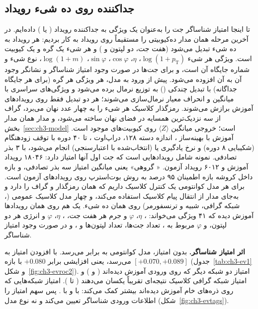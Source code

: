 \subsection{جداکننده روی ده شیء رویداد}
\label{sec:ch3-evqgnn}
تا اینجا امتیاز شناساگر جت را به‌عنوان یک ویژگی به جداکننده رویداد ( یا ) داده‌ایم. در آخرین مرحله همان مدار ده‌کیوبیتی را مستقیماً روی رویداد به کار بردیم: هر رویداد به ده شیء تبدیل می‌شود (هفت جت، دو لپتون و ) و هر شیء یک گره و یک کیوبیت است. ویژگی هر شیء $\log(1+p_\mathrm{T})$، $\eta$، $\cos\varphi$، $\sin\varphi$، $\log(1+m)$، نوع شیء و شماره جایگاه آن است، و برای جت‌ها در صورت وجود امتیاز شناساگر و نشانگر وجود آن به آن افزوده می‌شود. پیش از ورود به مدل، هر ویژگی هر گره (برای هر جایگاه جداگانه) با تبدیل چندکی () به توزیع نرمال برده می‌شود و ویژگی‌های سراسری با میانگین و انحراف معیار نرمال‌سازی می‌شوند؛ هر دو تبدیل فقط روی رویدادهای آموزش برازش می‌شوند. رمزگذار کلاسیک هر شیء را به چهار عدد نهان می‌برد، گراف از سه نزدیک‌ترین همسایه در فضای نهان ساخته می‌شود، و مدار همان مدار بخش~\ref{sec:ch3-model} است؛ خروجی میانگین $\langle Z\rangle$ روی کیوبیت‌های موجود است. آموزش با بهینه‌ساز ، اندازه دسته ۱۲۸، دراپ‌اوت ، تا ۴۰ دوره با توقف زودهنگام (شکیبایی ۸ دوره) و نرخ یادگیری  یا  (انتخاب‌شده با اعتبارسنجی) انجام می‌شود، با ۳ بذر تصادفی. نمونه شامل رویدادهایی است که جت اول آنها امتیاز دارد: ۱۸۰۴۶ رویداد آموزش و ۶۰۱۲ رویداد آزمون. « گروهی» یعنی  میانگین امتیاز سه بذر تصادفی، و بازه داخل کروشه بازه اطمینان ۹۵ درصد به روش بوت‌استرپ روی رویدادهای آزمون است. برای هر مدل کوانتومی یک کنترل کلاسیک داریم که همان رمزگذار و گراف را دارد و به‌جای مدار از انتقال پیام کلاسیک استفاده می‌کند، و چهار مدل کلاسیک عمومی (، شبکه گرافی، شبیه  و ترنسفورمر) روی همان ده شیء. یک  هم روی همان رویدادها آموزش دیده که ۴۱ ویژگی می‌خواند: \pt، $\eta$، $\varphi$ و جرم هر هفت جت، \pt، $\eta$، $\varphi$ و انرژی هر دو لپتون، \pt و $\varphi$ مربوط به ، تعداد جت‌ها، تعداد لپتون‌ها و ، و در صورت وجود امتیاز شناساگر.

\textbf{اثر امتیاز شناساگر.} بدون امتیاز، مدل کوانتومی به  برابر  می‌رسد. با افزودن امتیاز  به  می‌رسد، یعنی افزایشی برابر $+0.080$ با بازه $[+0.070,+0.089]$ (جدول~\ref{tab:ch3-ev1} و شکل~\ref{fig:ch3-evroc2}). امتیاز دو شبکه دیگر که روی ورودی  آموزش دیده‌اند ( و ) و امتیاز شبکه گرافی کلاسیک نتیجه‌ای تقریباً یکسان می‌دهند ( تا ). امتیاز شبکه‌هایی که روی ذره‌های خام آموزش دیده‌اند بیشتر کمک می‌کند:  با  و  با . پس سهم امتیاز را اطلاعات ورودی شناساگر تعیین می‌کند و نه نوع مدل (شکل~\ref{fig:ch3-evtags}).

